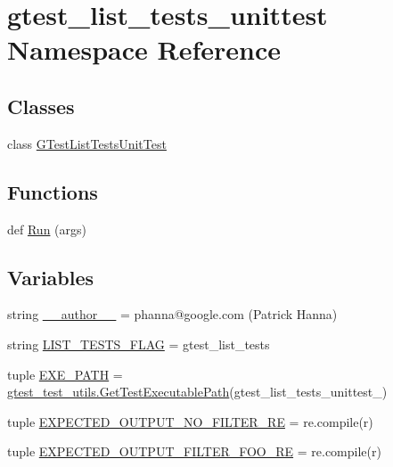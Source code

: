 \hypertarget{namespacegtest__list__tests__unittest}{}\section{gtest\+\_\+list\+\_\+tests\+\_\+unittest Namespace Reference}
\label{namespacegtest__list__tests__unittest}
\subsection*{Classes}
\begin{DoxyCompactItemize}
\item 
class \hyperlink{classgtest__list__tests__unittest_1_1_g_test_list_tests_unit_test}{G\+Test\+List\+Tests\+Unit\+Test}
\end{DoxyCompactItemize}
\subsection*{Functions}
\begin{DoxyCompactItemize}
\item 
def \hyperlink{namespacegtest__list__tests__unittest_ae820a362ba09ad61331e3f0c2a9f9cb6}{Run} (args)
\end{DoxyCompactItemize}
\subsection*{Variables}
\begin{DoxyCompactItemize}
\item 
string \hyperlink{namespacegtest__list__tests__unittest_a713be99fff40e5e280886232fa2f35ff}{\+\_\+\+\_\+author\+\_\+\+\_\+} = \textquotesingle{}phanna@google.\+com (Patrick Hanna)\textquotesingle{}
\item 
string \hyperlink{namespacegtest__list__tests__unittest_a658d9ea18c57a13a25d0cce73d314e7a}{L\+I\+S\+T\+\_\+\+T\+E\+S\+T\+S\+\_\+\+F\+L\+A\+G} = \textquotesingle{}gtest\+\_\+list\+\_\+tests\textquotesingle{}
\item 
tuple \hyperlink{namespacegtest__list__tests__unittest_afb67ca7674b402c226255d27f9147409}{E\+X\+E\+\_\+\+P\+A\+T\+H} = \hyperlink{namespacegtest__test__utils_a1bdf3cac86afa675ed37629b183048e9}{gtest\+\_\+test\+\_\+utils.\+Get\+Test\+Executable\+Path}(\textquotesingle{}gtest\+\_\+list\+\_\+tests\+\_\+unittest\+\_\+\textquotesingle{})
\item 
tuple \hyperlink{namespacegtest__list__tests__unittest_a57e38bc2bb7e78ba6b2ae48a1569d1f3}{E\+X\+P\+E\+C\+T\+E\+D\+\_\+\+O\+U\+T\+P\+U\+T\+\_\+\+N\+O\+\_\+\+F\+I\+L\+T\+E\+R\+\_\+\+R\+E} = re.\+compile(r)
\item 
tuple \hyperlink{namespacegtest__list__tests__unittest_a7677a2612a3c6a6ef3fcca86c96a2e99}{E\+X\+P\+E\+C\+T\+E\+D\+\_\+\+O\+U\+T\+P\+U\+T\+\_\+\+F\+I\+L\+T\+E\+R\+\_\+\+F\+O\+O\+\_\+\+R\+E} = re.\+compile(r)
\end{DoxyCompactItemize}


